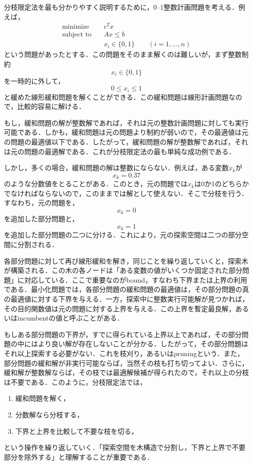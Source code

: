 分枝限定法を最も分かりやすく説明するために，0--1整数計画問題を考える．例えば，
\begin{align}
\text{minimize}\quad&c^Tx\\
\text{subject to}\quad&Ax\le b\\
&x_i\in \{0,1\}\qquad(i=1,\dots,n)
\end{align}
という問題があったとする．この問題をそのまま解くのは難しいが，まず整数制約
\begin{equation}
x_i\in \{0,1\}
\end{equation}
を一時的に外して，
\begin{equation}
0\le x_i\le 1
\end{equation}
と緩めた線形緩和問題を解くことができる．この緩和問題は線形計画問題なので，比較的容易に解ける．

もし，緩和問題の解が整数解であれば，それは元の整数計画問題に対しても実行可能である．しかも，緩和問題は元の問題より制約が弱いので，その最適値は元の問題の最適値以下である．したがって，緩和問題の解が整数解であれば，それは元の問題の最適解である．これが分枝限定法の最も単純な成功例である．

しかし，多くの場合，緩和問題の解は整数にならない．例えば，ある変数$x_k$が
\begin{equation}
x_k=0.37
\end{equation}
のような分数値をとることがある．このとき，元の問題では$x_k$は0か1のどちらかでなければならないので，このままでは解として使えない．そこで分枝を行う．すなわち，元の問題を，
\begin{equation}
x_k=0
\end{equation}
を追加した部分問題と，
\begin{equation}
x_k=1
\end{equation}
を追加した部分問題の二つに分ける．これにより，元の探索空間は二つの部分空間に分割される．

各部分問題に対して再び線形緩和を解き，同じことを繰り返していくと，探索木が構築される．この木の各ノードは「ある変数の値がいくつか固定された部分問題」に対応している．ここで重要なのがbound，すなわち下界または上界の利用である．最小化問題では，各部分問題の緩和問題の最適値は，その部分問題の真の最適値に対する下界を与える．一方，探索中に整数実行可能解が見つかれば，その目的関数値は元の問題に対する上界を与える．この上界を暫定最良解，あるいはincumbentの値と呼ぶことがある．

もしある部分問題の下界が，すでに得られている上界以上であれば，その部分問題の中にはより良い解が存在しないことが分かる．したがって，その部分問題はそれ以上探索する必要がない．これを枝刈り，あるいはpruningという．また，部分問題の緩和解が非実行可能ならば，当然その枝も打ち切ってよい．さらに，緩和解が整数解ならば，その枝では最適解候補が得られたので，それ以上の分枝は不要である．このように，分枝限定法では，
\begin{enumerate}
\item 緩和問題を解く，
\item 分数解なら分枝する，
\item 下界と上界を比較して不要な枝を切る，
\end{enumerate}
という操作を繰り返していく．「探索空間を木構造で分割し，下界と上界で不要部分を除外する」と理解することが重要である．

